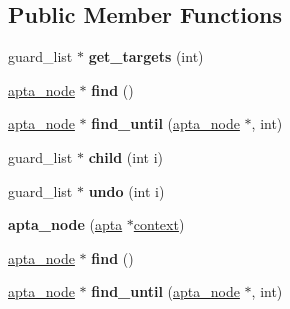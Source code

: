 \subsection*{Public Member Functions}
\begin{DoxyCompactItemize}
\item 
guard\+\_\+list $\ast$ {\bfseries get\+\_\+targets} (int)\hypertarget{classapta__node_a26b9c96df8920fdfe3db05e1c1897760}{}\label{classapta__node_a26b9c96df8920fdfe3db05e1c1897760}

\item 
\hyperlink{classapta__node}{apta\+\_\+node} $\ast$ {\bfseries find} ()\hypertarget{classapta__node_ab23b52a87dfdb6316a2ba30da7d31eb7}{}\label{classapta__node_ab23b52a87dfdb6316a2ba30da7d31eb7}

\item 
\hyperlink{classapta__node}{apta\+\_\+node} $\ast$ {\bfseries find\+\_\+until} (\hyperlink{classapta__node}{apta\+\_\+node} $\ast$, int)\hypertarget{classapta__node_a21857ccd42c6ddd9e920406a8e0321ff}{}\label{classapta__node_a21857ccd42c6ddd9e920406a8e0321ff}

\item 
guard\+\_\+list $\ast$ {\bfseries child} (int i)\hypertarget{classapta__node_a8f35cb3729fb653fd4d42723c5adac83}{}\label{classapta__node_a8f35cb3729fb653fd4d42723c5adac83}

\item 
guard\+\_\+list $\ast$ {\bfseries undo} (int i)\hypertarget{classapta__node_a26f2a8165511c6ef322c342c9cc89e79}{}\label{classapta__node_a26f2a8165511c6ef322c342c9cc89e79}

\item 
{\bfseries apta\+\_\+node} (\hyperlink{classapta}{apta} $\ast$\hyperlink{classapta__node_ae216b528459a269d45957a919a6180e8}{context})\hypertarget{classapta__node_ae27f86d054b6bfb50a908509969c1b09}{}\label{classapta__node_ae27f86d054b6bfb50a908509969c1b09}

\item 
\hyperlink{classapta__node}{apta\+\_\+node} $\ast$ {\bfseries find} ()\hypertarget{classapta__node_a5d339a47f63e54193f2d384244c8d61d}{}\label{classapta__node_a5d339a47f63e54193f2d384244c8d61d}

\item 
\hyperlink{classapta__node}{apta\+\_\+node} $\ast$ {\bfseries find\+\_\+until} (\hyperlink{classapta__node}{apta\+\_\+node} $\ast$, int)\hypertarget{classapta__node_a841d68d207517e998d12da726efd9498}{}\label{classapta__node_a841d68d207517e998d12da726efd9498}


\end{DoxyCompactItemize}
